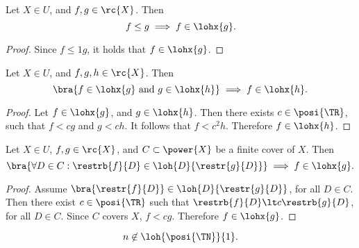 \documentclass[b5paper, english, oneside]{memoir}
\begin{document}
\begin{lemma}
\label{LinearOrderConsistency}
Let $X \in U$, and $f, g \in \rc{X}$. Then 
\begin{equation}
f \leq g \implies f \in \lohx{g}.
\end{equation}
\end{lemma}

\begin{proof}
Since $f \leq 1g$, it holds that $f \in \lohx{g}$.
\end{proof}

\begin{lemma}
\label{LinearTransitivity}
Let $X \in U$, and $f, g, h \in \rc{X}$. Then 
\begin{equation}
\bra{f \in \lohx{g} \textrm{ and } g \in \lohx{h}} \implies f \in \lohx{h}.
\end{equation}
\end{lemma}

\begin{proof}
Let $f \in \lohx{g}$, and $g \in \lohx{h}$. Then there exists $c \in \posi{\TR}$, such that $f \lt c g$ and $g \lt c h$. It follows that $f \lt c^2 h$. Therefore $f \in \lohx{h}$.
\end{proof}

\begin{lemma}
\label{LinearLocality}
Let $X \in U$, $f, g \in \rc{X}$, and $C \subset \power{X}$ be a finite cover of $X$. Then 
\begin{equation}
\bra{\forall D \in C: \restrb{f}{D} \in \loh{D}{\restr{g}{D}}} \implies f \in \lohx{g}.
\end{equation}
\end{lemma}

\begin{proof}
Assume $\bra{\restr{f}{D}} \in \loh{D}{\restr{g}{D}}$, for all $D \in C$. Then there exist $c \in \posi{\TR}$ such that $\restrb{f}{D} \lt c \restrb{g}{D}$, for all $D \in C$. Since $C$ covers $X$, $f \lt c g$. Therefore $f \in \lohx{g}$.
\end{proof}

\begin{lemma}
\label{LinearOneSeparation}
\begin{equation}
n \not\in \loh{\posi{\TN}}{1}. 
\end{equation} 
\end{lemma}
\end{document}
